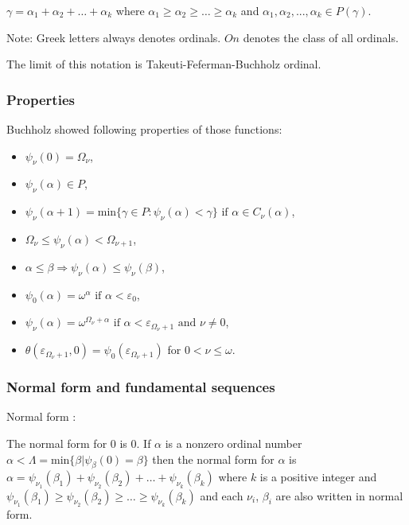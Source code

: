 \documentclass[10pt]{article}
\begin{document}
\(\gamma=\alpha_1+\alpha_2+\ldots+\alpha_k\) where \(\alpha_1\geq\alpha_2\geq\ldots\geq\alpha_k\) and \(\alpha_1,\alpha_2,...,\alpha_k \in P(\gamma)\).

Note: Greek letters always denotes ordinals. \(On\) denotes the class of all ordinals.

The limit of this notation is Takeuti-Feferman-Buchholz ordinal.


\subsubsection{Properties}


Buchholz showed following properties of those functions:

\begin{itemize}
     \setlength{\itemsep}{1pt}
     \setlength{\parskip}{0pt}
     \setlength{\parsep}{0pt}
\item \(\psi_\nu(0)=\Omega_\nu\),
\item \(\psi_\nu(\alpha)\in P\),
\item \(\psi_\nu(\alpha+1)=\text{min}\{\gamma\in P: \psi_\nu(\alpha)<\gamma\}\text{ if }\alpha\in C_\nu(\alpha)\),
\item \(\Omega_\nu\le\psi_\nu(\alpha)<\Omega_{\nu+1}\),
\item \(\alpha\le\beta\Rightarrow\psi_\nu(\alpha)\le\psi_\nu(\beta)\),
\item \(\psi_0(\alpha)=\omega^\alpha \text{ if }\alpha<\varepsilon_0\),
\item \(\psi_\nu(\alpha)=\omega^{\Omega_\nu+\alpha} \text{ if }\alpha<\varepsilon_{\Omega_\nu+1} \text{ and } \nu\neq 0\),
\item \(\theta(\varepsilon_{\Omega_\nu+1},0)=\psi_0(\varepsilon_{\Omega_\nu+1})\) for \(0<\nu\le\omega\).
\end{itemize}

\subsubsection{Normal form and fundamental sequences}

Normal form :

The normal form for 0 is 0. If \(\alpha\) is a nonzero ordinal number \(\alpha<\Lambda=\text{min}\{\beta|\psi_\beta(0)=\beta\}\) then the normal form for \(\alpha\) is \(\alpha=\psi_{\nu_1}(\beta_1)+\psi_{\nu_2}(\beta_2)+\ldots+\psi_{\nu_k}(\beta_k)\) where \(k\) is a positive integer and \(\psi_{\nu_1}(\beta_1)\geq\psi_{\nu_2}(\beta_2)\geq\ldots\geq\psi_{\nu_k}(\beta_k)\) and each \(\nu_i\), \(\beta_i\) are also written in normal form.
\end{document}
